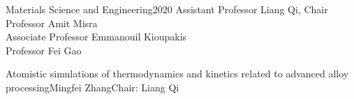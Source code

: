 \documentclass[reqno,12pt,oneside]{report} %
\theoremstyle{plain}
\theoremstyle{definition}
\theoremstyle{remark}
\numberwithin{theorem}{chapter}     %
\begin{document}


{Materials Science and Engineering}{2020}
{Assistant Professor Liang Qi, Chair\\
 Professor Amit Misra\\
 Associate Professor Emmanouil Kioupakis\\
 Professor Fei Gao}

\initializefrontsections



\makeatletter
\if@twoside \setcounter{page}{4} \else \setcounter{page}{1} \fi
\makeatother
 

\startacknowledgementspage

\label{Acknowledgements}

%

\tableofcontents     %
\listoffigures       %
\listoftables        %
\listofappendices    %
\listofabbreviations %

\startabstractpage
{Atomistic simulations of thermodynamics and kinetics related to advanced alloy processing}{Mingfei Zhang}{Chair: Liang Qi}

\label{Abstract}

\startthechapters 
\end{document}
